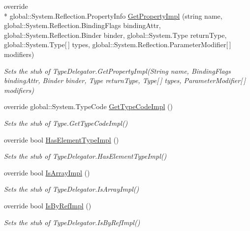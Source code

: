 \begin{DoxyCompactItemize}
override \\*
global\-::\-System.\-Reflection.\-Property\-Info \hyperlink{class_system_1_1_reflection_1_1_fakes_1_1_stub_type_delegator_a33e0d5b4c80e1625fd9be0d25fb0cd78}{Get\-Property\-Impl} (string name, global\-::\-System.\-Reflection.\-Binding\-Flags binding\-Attr, global\-::\-System.\-Reflection.\-Binder binder, global\-::\-System.\-Type return\-Type, global\-::\-System.\-Type\mbox{[}$\,$\mbox{]} types, global\-::\-System.\-Reflection.\-Parameter\-Modifier\mbox{[}$\,$\mbox{]} modifiers)
\begin{DoxyCompactList}\small\item\em Sets the stub of Type\-Delegator.\-Get\-Property\-Impl(\-String name, Binding\-Flags binding\-Attr, Binder binder, Type return\-Type, Type\mbox{[}$\,$\mbox{]} types, Parameter\-Modifier\mbox{[}$\,$\mbox{]} modifiers)\end{DoxyCompactList}\item 
override global\-::\-System.\-Type\-Code \hyperlink{class_system_1_1_reflection_1_1_fakes_1_1_stub_type_delegator_a30bfcea9efa92acef38f32b44f6efd28}{Get\-Type\-Code\-Impl} ()
\begin{DoxyCompactList}\small\item\em Sets the stub of Type.\-Get\-Type\-Code\-Impl()\end{DoxyCompactList}\item 
override bool \hyperlink{class_system_1_1_reflection_1_1_fakes_1_1_stub_type_delegator_ae341109aefbe1bd360f45f99ad4b15c2}{Has\-Element\-Type\-Impl} ()
\begin{DoxyCompactList}\small\item\em Sets the stub of Type\-Delegator.\-Has\-Element\-Type\-Impl()\end{DoxyCompactList}\item 
override bool \hyperlink{class_system_1_1_reflection_1_1_fakes_1_1_stub_type_delegator_a3f46167efeaf9e0d6af35b9d5bc66207}{Is\-Array\-Impl} ()
\begin{DoxyCompactList}\small\item\em Sets the stub of Type\-Delegator.\-Is\-Array\-Impl()\end{DoxyCompactList}\item 
override bool \hyperlink{class_system_1_1_reflection_1_1_fakes_1_1_stub_type_delegator_a44f3e40201649a44f76cfdad6eede1ca}{Is\-By\-Ref\-Impl} ()
\begin{DoxyCompactList}\small\item\em Sets the stub of Type\-Delegator.\-Is\-By\-Ref\-Impl()\end{DoxyCompactList}\item 

\end{DoxyCompactItemize}

